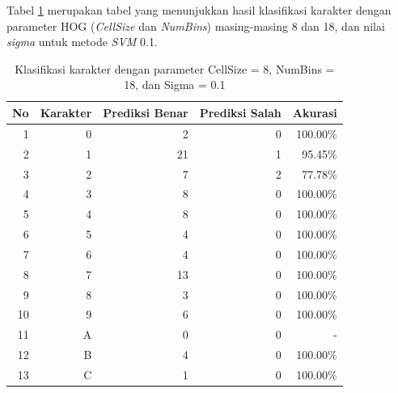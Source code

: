 \noindent Tabel \ref{tab:hasilklasifikasisel8} merupakan tabel yang menunjukkan hasil klasifikasi karakter dengan parameter HOG (\textit{CellSize} dan \textit{NumBins}) masing-masing 8 dan 18, dan nilai \textit{sigma} untuk metode \textit{SVM} 0.1.

\begin{longtable}[c]{|r|r|r|r|r|}
	\caption{Klasifikasi karakter dengan parameter CellSize = 8, NumBins = 18, dan Sigma = 0.1}
	\label{tab:hasilklasifikasisel8}\\
	\hline
	\textbf{No} & \textbf{Karakter} & \textbf{Prediksi Benar} & \textbf{Prediksi Salah} & \textbf{Akurasi} \\ \hline
	\endhead
	1           & 0                 & 2                       & 0                       &100.00\%            \\ \hline
	2           & 1                 & 21                       & 1                       &95.45\%            \\ \hline
	3           & 2                 & 7                       & 2                       &77.78\%            \\ \hline
	4           & 3                 & 8                       & 0                       &100.00\%            \\ \hline
	5           & 4                 & 8                       & 0                       &100.00\%            \\ \hline
	6           & 5                 & 4                       & 0                       &100.00\%            \\ \hline
	7           & 6                 & 4                       & 0                       &100.00\%            \\ \hline
	8           & 7                 & 13                       & 0                       &100.00\%            \\ \hline
	9           & 8                 & 3                       & 0                       &100.00\%            \\ \hline
	10           & 9                 & 6                       & 0                       &100.00\%            \\ \hline
	11           & A                 & 0                       & 0                       & -            \\ \hline
	12           & B                 & 4                       & 0                       &100.00\%            \\ \hline
	13           & C                 & 1                       & 0                       &100.00\%            \\ \hline

\end{longtable}
